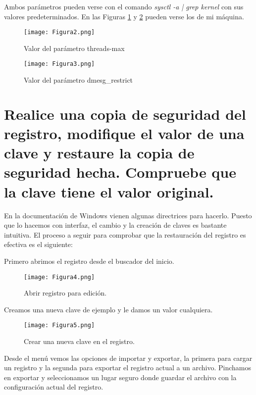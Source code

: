 Ambos parámetros pueden verse con el comando \textit{sysctl -a | grep kernel} con sus valores predeterminados. En las Figuras
\ref{fig:figura2} y \ref{fig:figura3} pueden verse los de mi máquina.

\begin{figure}[H] 
\centering
\texttt{[image: Figura2.png]}  
\caption{Valor del parámetro threads-max}\label{fig:figura2}
\end{figure}
\begin{figure}[H] 
\centering
\texttt{[image: Figura3.png]}  
\caption{Valor del parámetro dmesg\_restrict}\label{fig:figura3}
\end{figure}

\vspace{5mm}


\section{Realice una copia de seguridad del registro, modifique el valor de una clave y restaure la copia de seguridad hecha. Compruebe que la clave tiene el valor original.}

En la documentación de Windows\cite{register} vienen algunas directrices para hacerlo. Puesto que lo hacemos con interfaz, el
cambio y la creación de claves es bastante intuitiva. El proceso a seguir para comprobar que la restauración del registro es
efectiva es el siguiente:

Primero abrimos el registro desde el buscador del inicio.

\begin{figure}[H] 
\centering
\texttt{[image: Figura4.png]}  
\caption{Abrir registro para edición.}\label{fig:figura4}
\end{figure}

Creamos una nueva clave de ejemplo y le damos un valor cualquiera.

\begin{figure}[H] 
\centering
\texttt{[image: Figura5.png]}  
\caption{Crear una nueva clave en el registro.}\label{fig:figura5}
\end{figure}

Desde el menú vemos las opciones de importar y exportar, la primera para cargar un registro y la segunda para exportar el 
registro actual a un archivo. Pinchamos en exportar y seleccionamos un lugar seguro donde guardar el archivo con la
configuración actual del registro.

